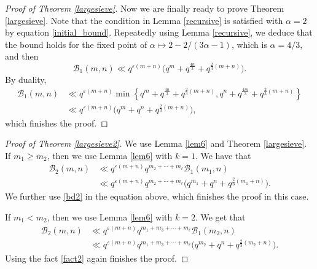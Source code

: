 \documentclass[12pt]{amsart}
\begin{document}
\begin{proof}[Proof of Theorem \ref{largesieve}]

Now we are finally ready to prove Theorem \ref{largesieve}. Note that the condition in Lemma \ref{recursive} is satisfied with $\alpha = 2$ by equation \eqref{initial_bound}. Repeatedly using Lemma \ref{recursive}, we deduce that the bound holds for the fixed point of $\alpha \mapsto 2 - 2/(3 \alpha -1)$, which is $\alpha = 4/3$, and then
$$\mathcal{B}_1(m,n) \ll q^{\varepsilon(m+n)} \Big( q^m +q^{\frac{4n}{3}} + q^{\frac{2}{3}(m+n)}\Big).$$
By duality,
\begin{align*}
 \mathcal{B}_1(m,n) &\ll q^{\varepsilon(m+n)} \min \left\{q^m+q^{ \frac{4n}{3}}+q^{\frac{2}{3} (m+n)}, q^n+q^{ \frac{4m}{3}}+q^{\frac{2}{3} (m+n)} \right\} \\
 & \ll q^{\varepsilon(m+n)} \Big(q^m+q^n+q^{\frac{2}{3}(m+n)} \Big),
\end{align*}
which finishes the proof.
\end{proof}

\begin{proof}[Proof of Theorem \ref{largesieve2}]
We use Lemma \ref{lem6} and Theorem \ref{largesieve}. If $m_1 \geq m_2$, then we use Lemma \ref{lem6} with $k=1$. We have that
\begin{align*}
\mathcal{B}_2(m,n) & \ll q^{\varepsilon(m+n)} q^{m_2+\cdots+m_{\ell}} \mathcal{B}_1(m_1,n) \\
& \ll  q^{\varepsilon(m+n)} q^{m_2+\cdots+m_{\ell}} \Big(q^{m_1}+q^n+q^{\frac{2}{3}(m_1+n)} \Big).
\end{align*}
We further use \eqref{bd2} in the equation above, which finishes the proof in this case.

If $m_1<m_2$, then we use Lemma \ref{lem6} with $k=2$. We get that
\begin{align*}
\mathcal{B}_2(m,n) & \ll q^{\varepsilon(m+n)} q^{m_1+m_3+\cdots+m_{\ell}} \mathcal{B}_1(m_2,n) \\
& \ll  q^{\varepsilon(m+n)} q^{m_1+m_3+\cdots+m_{\ell}} \Big(q^{m_2}+q^n+q^{\frac{2}{3}(m_2+n)} \Big).
\end{align*}
Using the fact \eqref{fact2} again finishes the proof.
\end{proof}




 


\end{document}
